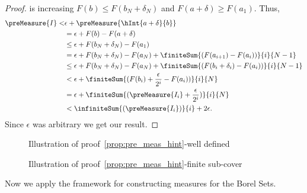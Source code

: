\begin{proof}
    is increasing $F(b) \leq F(b_N + \delta_{N})$ and $F(a+\delta) \geq F(a_1)$. 
    Thus,
    \begin{align*}
	\preMeasure{I} <& \epsilon + \preMeasure{\hInt{a+\delta}{b}} \\
	&= \epsilon + F(b) - F(a + \delta) \\
	&\leq \epsilon  + F(b_N + \delta_N) - F(a_1)  \\
	&= \epsilon  + F(b_N + \delta_N) - F(a_N) + \finiteSum{(F(a_{i+1}) - F(a_i))}{i}{N-1} \\
	&\leq \epsilon + F(b_N + \delta_N) - F(a_N) +
       	\finiteSum{(F(b_{i}+ \delta_{i}) - F(a_i))}{i}{N-1}\\
	&< \epsilon + \finiteSum{(F(b_i)+\frac{\epsilon}{2^i}-F(a_i))}{i}{N} \\
	&= \epsilon + \finiteSum{(\preMeasure{I_i} +\frac{\epsilon}{2^i})}{i}{N} \\
	&< \infiniteSum{(\preMeasure{I_i})}{i} + 2\epsilon.
    \end{align*}
    Since $\epsilon$ was arbitrary we get our result.
\end{proof}

\begin{figure}
    
    \caption{Illustration of proof~\ref{prop:pre_meas_hint}-well defined}\label{fig:tikz:borel_pre_meas}
\end{figure}

\begin{figure}
    
    \caption{Illustration of proof~\ref{prop:pre_meas_hint}-finite sub-cover}\label{fig:tikz:borel_pre_meas2}
\end{figure}

Now we apply the framework for constructing measures for the Borel Sets.

